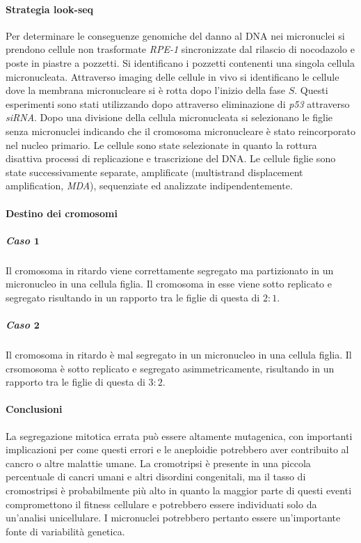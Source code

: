 \paragraph{Strategia look-seq}
Per determinare le conseguenze genomiche del danno al DNA nei micronuclei si prendono cellule non trasformate \emph{RPE-1} sincronizzate dal rilascio di nocodazolo e poste in piastre
a pozzetti. Si identificano i pozzetti contenenti una singola cellula micronucleata. Attraverso imaging delle cellule in vivo si identificano le cellule dove la membrana micronucleare
si \`e rotta dopo l'inizio della fase $S$. Questi esperimenti sono stati utilizzando dopo attraverso eliminazione di \emph{p53} attraverso \emph{siRNA}. Dopo una divisione della cellula
micronucleata si selezionano le figlie senza micronuclei indicando che il cromosoma micronucleare \`e stato reincorporato nel nucleo primario. Le cellule sono state selezionate in quanto
la rottura disattiva processi di replicazione e trascrizione del DNA. Le cellule figlie sono state successivamente separate, amplificate (multistrand displacement amplification, 
\emph{MDA}), sequenziate ed analizzate indipendentemente.
\paragraph{Destino dei cromosomi}
\subparagraph{Caso $\mathbf{1}$}
Il cromosoma in ritardo viene correttamente segregato ma partizionato in un micronucleo in una cellula figlia. Il cromosoma in esse viene sotto replicato e segregato risultando in un
rapporto tra le figlie di questa di $2:1$.
\subparagraph{Caso $\mathbf{2}$}
Il cromosoma in ritardo \`e mal segregato in un micronucleo in una cellula figlia. Il crsomosoma \`e sotto replicato e segregato asimmetricamente, risultando in un rapporto tra le figlie
di questa di $3:2$.
\paragraph{Conclusioni}
La segregazione mitotica errata pu\`o essere altamente mutagenica, con importanti implicazioni per come questi errori e le aneploidie potrebbero aver contribuito al cancro o altre 
malattie umane. La cromotripsi \`e presente in una piccola percentuale di cancri umani e altri disordini congenitali, ma il tasso di cromostripsi \`e probabilmente pi\`u alto in 
quanto la maggior parte di questi eventi compromettono il fitness cellulare e potrebbero essere individuati solo da un'analisi unicellulare. I micronuclei potrebbero pertanto 
essere un'importante fonte di variabilit\`a genetica. 

